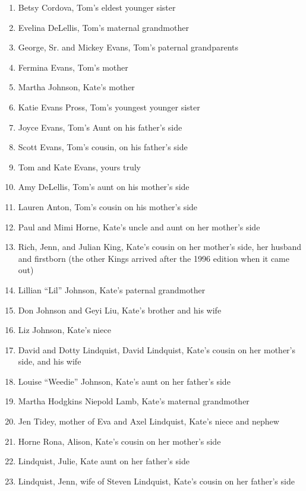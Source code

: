 \documentclass[12pt]{article}
\begin{document}
\begin{enumerate}
 \itemsep0pt
 \parskip1pt
\item Betsy Cordova, Tom's eldest younger sister %
\item Evelina DeLellis, Tom's maternal grandmother
\item George, Sr. and Mickey Evans, Tom's paternal grandparents
\item Fermina Evans, Tom's mother %
\item Martha Johnson, Kate's mother
\item Katie Evans Pross, Tom's youngest younger sister
\item Joyce Evans, Tom's Aunt on his father's side
\item Scott Evans, Tom's cousin, on his father's side
\item Tom and Kate Evans, yours truly %
\item Amy DeLellis, Tom's aunt on his mother's side
\item Lauren Anton, Tom's cousin on his mother's side
\item Paul and Mimi Horne, Kate's uncle and aunt on her mother's side %
\item Rich, Jenn, and Julian King, Kate's cousin on her mother's side, her husband and firstborn (the other Kings arrived after the 1996 edition when it came out)
\item Lillian ``Lil'' Johnson, Kate's paternal grandmother 
\item Don Johnson and Geyi Liu, Kate's brother and his wife
\item Liz Johnson, Kate's niece 
\item David and Dotty Lindquist, David Lindquist, Kate's cousin on her mother's side, and his wife
\item Louise ``Weedie'' Johnson, Kate's aunt on her father's side
\item Martha Hodgkins Niepold Lamb, Kate's maternal grandmother
\item Jen Tidey, mother of Eva and Axel Lindquist, Kate's niece and nephew
\item Horne Rona, Alison, Kate's cousin on her mother's side
\item Lindquist, Julie, Kate aunt on her father's side
\item Lindquist, Jenn, wife of Steven Lindquist, Kate's cousin on her father's side

\end{enumerate}
\end{document}
